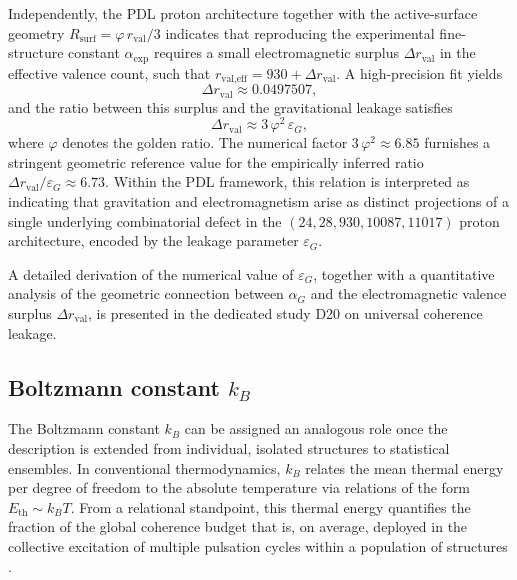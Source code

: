 \documentclass[11pt,a4paper]{article}
\begin{document}
Independently, the PDL proton architecture together with the active-surface geometry
$R_{\text{surf}} = \varphi\, r_{\text{val}}/3$ indicates that reproducing the experimental fine-structure constant
$\alpha_{\text{exp}}$ requires a small electromagnetic surplus
$\Delta r_{\text{val}}$ in the effective valence count, such that $r_{\text{val,eff}} = 930 + \Delta r_{\text{val}}$.\cite{Alpha_PDL_v2_2026,Universal_Coherence_Leakage_V3_2026}
A high-precision fit yields
\[
\Delta r_{\text{val}} \approx 0.0497507,
\]
and the ratio between this surplus and the gravitational leakage satisfies
\[
\Delta r_{\text{val}} \approx 3\,\varphi^2\,\varepsilon_G,
\]
where $\varphi$ denotes the golden ratio. The numerical factor
$3\,\varphi^2 \approx 6.85$ furnishes a stringent geometric reference value for the empirically inferred ratio $\Delta r_{\text{val}} / \varepsilon_G \approx 6.73$.
Within the PDL framework, this relation is interpreted as indicating that gravitation and electromagnetism arise as distinct projections of a single underlying combinatorial defect in the $(24,28,930,10087,11017)$ proton architecture, encoded by the leakage parameter $\varepsilon_G$.

A detailed derivation of the numerical value of $\varepsilon_G$, together with a quantitative analysis of the geometric connection between $\alpha_G$ and the electromagnetic valence surplus $\Delta r_{\mathrm{val}}$, is presented in the dedicated study D20 on universal coherence leakage.\citep{Universal_Coherence_Leakage_V3_2026}

\subsection{Boltzmann constant \texorpdfstring{\(k_B\)}{kB}}
\label{subsec:kB}

The Boltzmann constant \(k_B\) can be assigned an analogous role once the description is extended from individual, isolated structures to statistical ensembles. In conventional thermodynamics, \(k_B\) relates the mean thermal energy per degree of freedom to the absolute temperature via relations of the form \(E_{\mathrm{th}} \sim k_B T\). From a relational standpoint, this thermal energy quantifies the fraction of the global coherence budget that is, on average, deployed in the collective excitation of multiple pulsation cycles within a population of structures
\citep{PDL_Main_2026,PDL_position}.
\end{document}
